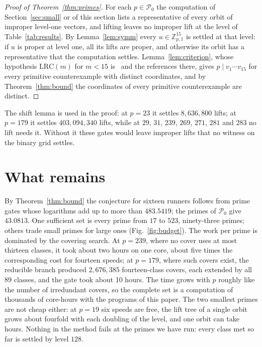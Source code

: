 \documentclass[11pt]{amsart}
\theoremstyle{definition}
\theoremstyle{remark}
\newcommand{\Z}{\mathbb{Z}}
\newcommand{\LRC}{\mathrm{LRC}}
\begin{document}
\begin{proof}[Proof of Theorem~\ref{thm:primes}]
For each $p\in\mathcal P_0$ the computation of Section~\ref{sec:small} or of
this section lists a representative of every orbit of improper level-one
vectors, and lifting leaves no improper lift at the level of
Table~\ref{tab:results}. By Lemma~\ref{lem:symm} every $u\in\Z_{p,1}^{15}$ is
settled at that level: if $u$ is proper at level one, all its lifts are
proper, and otherwise its orbit has a representative that the computation
settles. Lemma~\ref{lem:criterion}, whose hypothesis $\LRC(m)$ for $m<15$
is~\cite{All26} and the references there, gives $p\mid v_1\cdots v_{15}$ for
every primitive counterexample with distinct coordinates, and by
Theorem~\ref{thm:bound} the coordinates of every primitive counterexample are
distinct.
\end{proof}

The shift lemma is used in the proof: at $p=23$ it settles $8{,}636{,}800$ lifts; at $p=179$ it settles $403{,}094{,}340$ lifts, while at $29$, $31$, $239$, $269$, $271$, $281$ and $283$ no lift needs it. Without it these gates would leave improper lifts that no witness on the binary grid settles.

\section{What remains}\label{sec:remains}

By Theorem~\ref{thm:bound} the conjecture for sixteen runners follows from
prime gates whose logarithms add up to more than $483.5419$; the primes of
$\mathcal P_0$ give $43.0813$. One sufficient set is every prime from
$17$ to $523$, ninety-three primes; others trade small primes for large ones
(Fig.~\ref{fig:budget}). The work per prime is dominated by the covering
search. At $p=239$, where no cover uses at most thirteen classes, it took
about two hours on one core, about five times the corresponding cost for
fourteen speeds; at $p=179$, where such covers exist, the reducible branch
produced $2{,}676{,}385$ fourteen-class covers, each extended by all
$89$ classes, and the gate took about 10 hours. The time
grows with $p$ roughly like the number of irredundant covers, so the
complete set is a computation of thousands of core-hours with the programs
of this paper. The two smallest primes are not cheap either: at $p=19$ six
speeds are free, the lift tree of a single orbit grows about fourfold with
each doubling of the level, and one orbit can take hours. Nothing in the
method fails at the primes we have run: every class met so far is settled
by level $128$.
\end{document}
